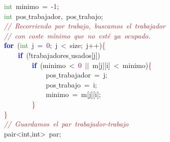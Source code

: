 \mbox{}\ \ \ \ \ \ \ \ \textcolor{ForestGreen}{int}\ minimo\ \textcolor{BrickRed}{=}\ \textcolor{BrickRed}{-}\textcolor{Purple}{1}\textcolor{BrickRed}{;} \\
\mbox{}\ \ \ \ \ \ \ \ \textcolor{ForestGreen}{int}\ pos$\_$trabajador\textcolor{BrickRed}{,}\ pos$\_$trabajo\textcolor{BrickRed}{;}\  \\
\mbox{}\ \ \ \ \ \ \ \ \textit{\textcolor{Brown}{//\ Recorriendo\ por\ trabajo,\ buscamos\ el\ trabajador\ }} \\
\mbox{}\ \ \ \ \ \ \ \ \textit{\textcolor{Brown}{//\ con\ coste\ mínimo\ que\ no\ esté\ ya\ ocupado.}} \\
\mbox{}\ \ \ \ \ \ \ \ \textbf{\textcolor{Blue}{for}}\ \textcolor{BrickRed}{(}\textcolor{ForestGreen}{int}\ j\ \textcolor{BrickRed}{=}\ \textcolor{Purple}{0}\textcolor{BrickRed}{;}\ j\ \textcolor{BrickRed}{\textless{}}\ size\textcolor{BrickRed}{;}\ j\textcolor{BrickRed}{++)}\textcolor{Red}{\{} \\
\mbox{}\ \ \ \ \ \ \ \ \ \ \ \ \textbf{\textcolor{Blue}{if}}\ \textcolor{BrickRed}{(!}trabajadores$\_$usados\textcolor{BrickRed}{[}j\textcolor{BrickRed}{])}\  \\
\mbox{}\ \ \ \ \ \ \ \ \ \ \ \ \ \ \ \ \textbf{\textcolor{Blue}{if}}\ \textcolor{BrickRed}{(}minimo\ \textcolor{BrickRed}{\textless{}}\ \textcolor{Purple}{0}\ \textcolor{BrickRed}{$|$$|$}\ m\textcolor{BrickRed}{[}j\textcolor{BrickRed}{][}i\textcolor{BrickRed}{]}\ \textcolor{BrickRed}{\textless{}}\ minimo\textcolor{BrickRed}{)}\textcolor{Red}{\{} \\
\mbox{}\ \ \ \ \ \ \ \ \ \ \ \ \ \ \ \ \ \ \ \ pos$\_$trabajador\ \textcolor{BrickRed}{=}\ j\textcolor{BrickRed}{;}\  \\
\mbox{}\ \ \ \ \ \ \ \ \ \ \ \ \ \ \ \ \ \ \ \ pos$\_$trabajo\ \textcolor{BrickRed}{=}\ i\textcolor{BrickRed}{;}\  \\
\mbox{}\ \ \ \ \ \ \ \ \ \ \ \ \ \ \ \ \ \ \ \ minimo\ \textcolor{BrickRed}{=}\ m\textcolor{BrickRed}{[}j\textcolor{BrickRed}{][}i\textcolor{BrickRed}{];}\  \\
\mbox{}\ \ \ \ \ \ \ \ \ \ \ \ \ \ \ \ \textcolor{Red}{\}}\ \ \ \  \\
\mbox{}\ \ \ \ \ \ \ \ \textcolor{Red}{\}} \\
\mbox{}\ \ \ \ \ \ \ \ \textit{\textcolor{Brown}{//\ Guardamos\ el\ par\ trabajador-trabajo}} \\
\mbox{}\ \ \ \ \ \ \ \ \textcolor{TealBlue}{pair\textless{}int,int\textgreater{}}\ par\textcolor{BrickRed}{;}\  \\
